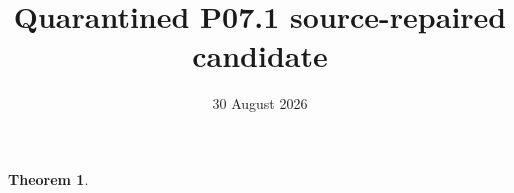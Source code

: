 \documentclass[11pt]{article}
\newtheorem{theorem}{Theorem}
\begin{document}
\title{Quarantined P07.1 source-repaired candidate}
\author{}
\date{30 August 2026}
\maketitle

\begin{theorem}

\end{theorem}


\end{document}

